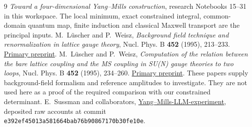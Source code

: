 \documentclass[11pt]{article}
\theoremstyle{remark}
\begin{document}
\begin{thebibliography}{9}
\emph{Toward a four-dimensional Yang--Mills construction},
research Notebooks 15--31 in this workspace.
The local minimum, exact constrained integral, common-domain
quantum map, finite induction and classical Maxwell transport
are the principal inputs.
M.~L\"uscher and P.~Weisz,
\emph{Background field technique and renormalization in lattice
gauge theory}, Nucl. Phys. B \textbf{452} (1995), 213--233.
\href{https://arxiv.org/abs/hep-lat/9504006}{Primary preprint}.
M.~L\"uscher and P.~Weisz,
\emph{Computation of the relation between the bare lattice
coupling and the MS coupling in SU(N) gauge theories to two
loops}, Nucl. Phys. B \textbf{452} (1995), 234--260.
\href{https://arxiv.org/abs/hep-lat/9505011}{Primary preprint}.
These papers supply background-field formalism and reference
amplitudes to investigate. They are not used here as a proof of
the required comparison with our constrained determinant.
E.~Sussman and collaborators,
\href{https://github.com/ethanwsussman/Yang--Mills-LLM-experiment}
{Yang--Mills-LLM-experiment}, deposited raw accounts at commit
\texttt{e392ef45013a581664bab76b90867170b30fe10e}.
\end{thebibliography}
\end{document}
